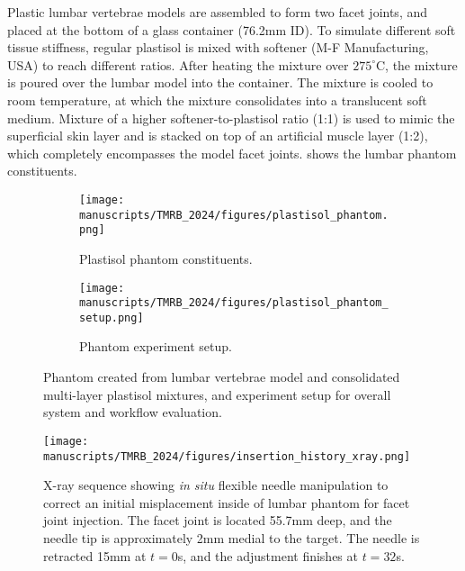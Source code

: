 Plastic lumbar vertebrae models are assembled to form two facet joints, and placed at the bottom of a glass container (76.2mm ID). To simulate different soft tissue stiffness, regular plastisol is mixed with softener (M-F Manufacturing, USA) to reach different ratios. After heating the mixture over $275^{\circ}$C, the mixture is poured over the lumbar model into the container. The mixture is cooled to room temperature, at which the mixture consolidates into a translucent soft medium. Mixture of a higher softener-to-plastisol ratio (1:1) is used to mimic the superficial skin layer and is stacked on top of an artificial muscle layer (1:2), which completely encompasses the model facet joints.  shows the lumbar phantom constituents.
\begin{figure}[ht!]
    \centering
    \begin{subfigure}[t]{0.275\columnwidth}
        \centering
\texttt{[image: manuscripts/TMRB\_2024/figures/plastisol\_phantom.png]}
        \caption{Plastisol phantom constituents.}
        \label{fig:chap-3-plastisol-phantom}
      \end{subfigure}%
      \quad
      \begin{subfigure}[t]{0.65\columnwidth}
        \centering
        \texttt{[image: manuscripts/TMRB\_2024/figures/plastisol\_phantom\_setup.png]}
        \caption{Phantom experiment setup.}
        \label{fig:chap-3-plastisol-phantom-setup}
      \end{subfigure}
    \caption{Phantom created from lumbar vertebrae model and consolidated multi-layer plastisol mixtures, and experiment setup for overall system and workflow evaluation.}
\end{figure}

\begin{figure}[!h]
  \centering
  \texttt{[image: manuscripts/TMRB\_2024/figures/insertion\_history\_xray.png]}
  \caption{X-ray sequence showing \textit{in situ} flexible needle manipulation to correct an initial misplacement inside of lumbar phantom for facet joint injection. The facet joint is located 55.7mm deep, and the needle tip is approximately 2mm medial to the target. The needle is retracted 15mm at $t=0$s, and the adjustment finishes at $t=32$s.}
  \label{fig:chap-3-insertion-history-overlay}
\end{figure}

